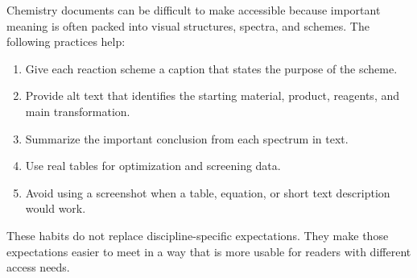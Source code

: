 Chemistry documents can be difficult to make accessible because important meaning is often packed into visual structures, spectra, and schemes. The following practices help:
\begin{enumerate}
  \item Give each reaction scheme a caption that states the purpose of the scheme.
  \item Provide alt text that identifies the starting material, product, reagents, and main transformation.
  \item Summarize the important conclusion from each spectrum in text.
  \item Use real tables for optimization and screening data.
  \item Avoid using a screenshot when a table, equation, or short text description would work.
\end{enumerate}

These habits do not replace discipline-specific expectations. They make those expectations easier to meet in a way that is more usable for readers with different access needs.
